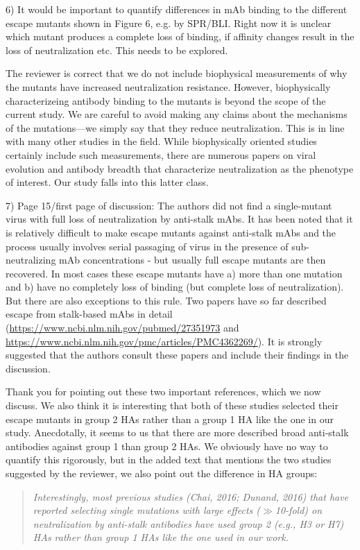 \documentclass[11pt, oneside]{article}   	%
\begin{document}
6) It would be important to quantify differences in mAb binding to the different escape mutants shown in Figure 6, e.g. by SPR/BLI. Right now it is unclear which mutant produces a complete loss of binding, if affinity changes result in the loss of neutralization etc. This needs to be explored.

{\color{black}
The reviewer is correct that we do not include biophysical measurements of why the mutants have increased neutralization resistance.
However, biophysically characterizeing antibody binding to the mutants is beyond the scope of the current study.
We are careful to avoid making any claims about the mechanisms of the mutations---we simply say that they reduce neutralization.
This is in line with many other studies in the field.
While biophysically oriented studies certainly include such measurements, there are numerous papers on viral evolution and antibody breadth that characterize neutralization as the phenotype of interest.
Our study falls into this latter class.
}

7) Page 15/first page of discussion: The authors did not find a single-mutant virus with full loss of neutralization by anti-stalk mAbs. It has been noted that it is relatively difficult to make escape mutants against anti-stalk mAbs and the process usually involves serial passaging of virus in the presence of sub-neutralizing mAb concentrations - but usually full escape mutants are then recovered. In most cases these escape mutants have a) more than one mutation and b) have no completely loss of binding (but complete loss of neutralization). But there are also exceptions to this rule. Two papers have so far described escape from stalk-based mAbs in detail (\url{https://www.ncbi.nlm.nih.gov/pubmed/27351973} and \url{https://www.ncbi.nlm.nih.gov/pmc/articles/PMC4362269/}). It is strongly suggested that the authors consult these papers and include their findings in the discussion.

{\color{black}
Thank you for pointing out these two important references, which we now discuss.
We also think it is interesting that both of these studies selected their escape mutants in group 2 HAs rather than a group 1 HA like the one in our study.
Anecdotally, it seems to us that there are more described broad anti-stalk antibodies against group 1 than group 2 HAs.
We obviously have no way to quantify this rigorously, but in the added text that mentions the two studies suggested by the reviewer, we also point out the difference in HA groups:

\begin{quote}
\textsl{Interestingly, most previous studies (Chai, 2016; Dunand, 2016) that have reported selecting single mutations with large effects ($\gg$10-fold) on neutralization by anti-stalk antibodies have used group 2 (e.g., H3 or H7) HAs rather than group 1 HAs like the one used in our work.}
\end{quote}
}
\end{document}
